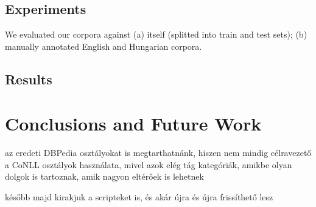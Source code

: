 \documentclass[11pt]{article}
\begin{document}

\subsection{Experiments}

We evaluated our corpora against (a) itself (splitted into train and test sets); (b) manually annotated English and Hungarian corpora. 






\subsection{Results}


\section{Conclusions and Future Work}

az eredeti DBPedia osztályokat is megtarthatnánk, hiszen nem mindig célravezető a CoNLL osztályok használata, mivel azok elég tág kategóriák, amikbe olyan dolgok is tartoznak, amik nagyon eltérőek is lehetnek

később majd kirakjuk a scripteket is, és akár újra és újra frissíthető lesz


\end{document}
